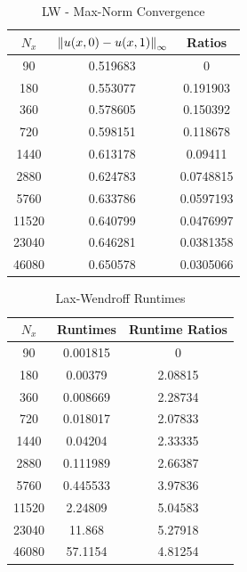 \documentclass[12pt]{article}
\begin{document}
\begin{minipage}{0.5\textwidth}
\begin{table}[H]
\caption{LW - Max-Norm Convergence}
\centering\begin{tabular}{||c|cc||}
\hline \hline
   $N_x$ & $\norm{u(x,0)-u(x,1)}_{\infty}$ &   Ratios \\
\hline
    90 &         0.519683 & 0         \\
   180 &         0.553077 & 0.191903  \\
   360 &         0.578605 & 0.150392  \\
   720 &         0.598151 & 0.118678  \\
  1440 &         0.613178 & 0.09411   \\
  2880 &         0.624783 & 0.0748815 \\
  5760 &         0.633786 & 0.0597193 \\
 11520 &         0.640799 & 0.0476997 \\
 23040 &         0.646281 & 0.0381358 \\
 46080 &         0.650578 & 0.0305066 \\
\hline \hline
\end{tabular}\end{table}\end{minipage}
\begin{minipage}{0.5\textwidth}
\begin{table}[H]
\caption{Lax-Wendroff Runtimes}
\centering\begin{tabular}{||c|cc||}
\hline \hline
    $N_x$ &   Runtimes &   Runtime Ratios \\
\hline
    90 &   0.001815 &          0       \\
   180 &   0.00379  &          2.08815 \\
   360 &   0.008669 &          2.28734 \\
   720 &   0.018017 &          2.07833 \\
  1440 &   0.04204  &          2.33335 \\
  2880 &   0.111989 &          2.66387 \\
  5760 &   0.445533 &          3.97836 \\
 11520 &   2.24809  &          5.04583 \\
 23040 &  11.868    &          5.27918 \\
 46080 &  57.1154   &          4.81254 \\
\hline \hline
\end{tabular}\end{table}\end{minipage}\\
\end{document}
